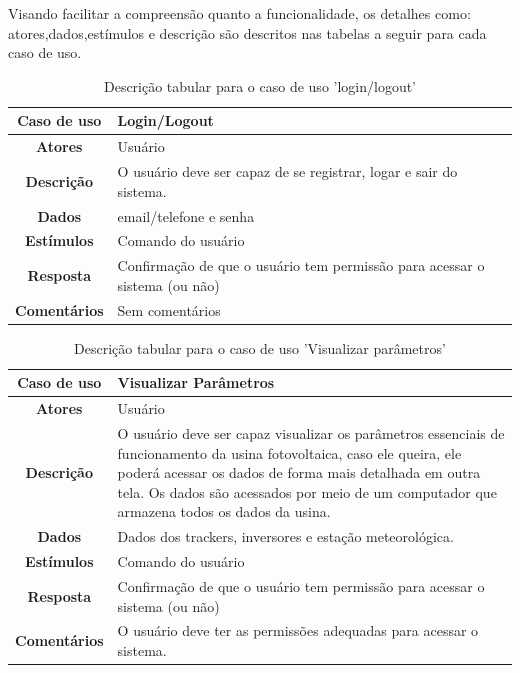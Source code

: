 \documentclass[a4paper,12pt]{article}
\begin{document}
Visando facilitar a compreensão quanto a funcionalidade, os detalhes como: atores,dados,estímulos e descrição são descritos nas tabelas a seguir para cada caso de uso.
\begin{table}[htbp]
\begin{center}
\begin{tabular}{|c|p{13cm}|}
\hline
\cellcolor{gray} \textbf{Caso de uso} &  Login/Logout\\
\hline
\cellcolor{gray} \textbf{Atores}  & Usuário \\
\hline
\cellcolor{gray} \textbf{Descrição} &   O usuário deve ser capaz de se registrar, logar e sair do sistema.      \\
\hline
\cellcolor{gray} \textbf{Dados} &  email/telefone e senha \\ 
\hline
\cellcolor{gray} \textbf{Estímulos} & Comando do usuário \\
\hline
\cellcolor{gray} \textbf{Resposta} & Confirmação de que o usuário tem permissão para acessar o sistema (ou não) \\
\hline
\cellcolor{gray} \textbf{Comentários} & Sem comentários  \\
\hline
\end{tabular}
\caption{Descrição tabular para o caso de uso 'login/logout'}
\label{tab:login}
\end{center}
\end{table}


\begin{table}[htbp]
\begin{center}
\begin{tabular}{|c|p{13.2cm}|}
\hline
\cellcolor{gray} \textbf{Caso de uso} &   Visualizar Parâmetros\\
\hline
\cellcolor{gray} \textbf{Atores}  & Usuário \\
\hline
\cellcolor{gray} \textbf{Descrição} &   O usuário deve ser capaz visualizar os parâmetros essenciais de funcionamento da usina fotovoltaica, caso ele queira, ele poderá acessar os dados de forma mais detalhada em outra tela. Os dados são acessados por meio de um computador que armazena todos os dados da usina.    \\
\hline
\cellcolor{gray} \textbf{Dados} &  Dados dos trackers, inversores e estação meteorológica. \\ 
\hline
\cellcolor{gray} \textbf{Estímulos} & Comando do usuário \\
\hline
\cellcolor{gray} \textbf{Resposta} & Confirmação de que o usuário tem permissão para acessar o sistema (ou não) \\
\hline
\cellcolor{gray} \textbf{Comentários} &  O usuário deve ter as permissões adequadas para acessar o sistema.  \\
\hline
\end{tabular}
\caption{Descrição tabular para o caso de uso 'Visualizar parâmetros'}
\label{tab:visualizar_P}
\end{center}
\end{table}
\end{document}

